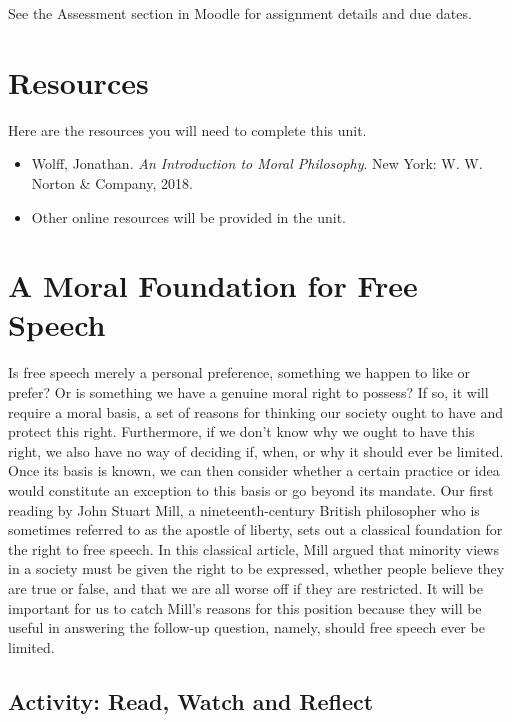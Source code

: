 \documentclass[
]{book}
\providecommand{\tightlist}{%
  \setlength{\itemsep}{0pt}\setlength{\parskip}{0pt}}
\begin{document}
See the Assessment section in Moodle for assignment details and due dates.

\hypertarget{resources-2}{%
\section*{Resources}\label{resources-2}}

Here are the resources you will need to complete this unit.

\begin{itemize}
\tightlist
\item
  Wolff, Jonathan. \emph{An Introduction to Moral Philosophy}. New York: W. W. Norton \& Company, 2018.
\item
  Other online resources will be provided in the unit.
\end{itemize}

\hypertarget{a-moral-foundation-for-free-speech}{%
\section{A Moral Foundation for Free Speech}\label{a-moral-foundation-for-free-speech}}

Is free speech merely a personal preference, something we happen to like or prefer? Or is something we have a genuine moral right to possess? If so, it will require a moral basis, a set of reasons for thinking our society ought to have and protect this right. Furthermore, if we don't know why we ought to have this right, we also have no way of deciding if, when, or why it should ever be limited. Once its basis is known, we can then consider whether a certain practice or idea would constitute an exception to this basis or go beyond its mandate. Our first reading by John Stuart Mill, a nineteenth-century British philosopher who is sometimes referred to as the apostle of liberty, sets out a classical foundation for the right to free speech. In this classical article, Mill argued that minority views in a society must be given the right to be expressed, whether people believe they are true or false, and that we are all worse off if they are restricted. It will be important for us to catch Mill's reasons for this position because they will be useful in answering the follow-up question, namely, should free speech ever be limited.

\hypertarget{activity-read-watch-and-reflect-6}{%
\subsection*{Activity: Read, Watch and Reflect}\label{activity-read-watch-and-reflect-6}}
\end{document}

